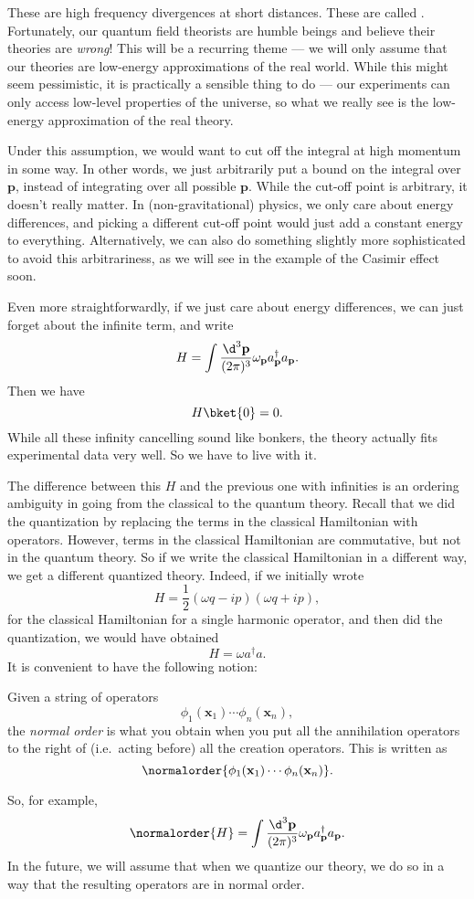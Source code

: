 \documentclass[a4paper]{article}
\begin{document}
These are high frequency divergences at short distances. These are called . Fortunately, our quantum field theorists are humble beings and believe their theories are \emph{wrong}! This will be a recurring theme --- we will only assume that our theories are low-energy approximations of the real world. While this might seem pessimistic, it is practically a sensible thing to do --- our experiments can only access low-level properties of the universe, so what we really see is the low-energy approximation of the real theory.

Under this assumption, we would want to cut off the integral at high momentum in some way. In other words, we just arbitrarily put a bound on the integral over $\mathbf{p}$, instead of integrating over all possible $\mathbf{p}$. While the cut-off point is arbitrary, it doesn't really matter. In (non-gravitational) physics, we only care about energy differences, and picking a different cut-off point would just add a constant energy to everything. Alternatively, we can also do something slightly more sophisticated to avoid this arbitrariness, as we will see in the example of the Casimir effect soon.

Even more straightforwardly, if we just care about energy differences, we can just forget about the infinite term, and write
\[
  H = \int \frac{\d^3 \mathbf{p}}{(2\pi)^3} \omega_\mathbf{p} a_\mathbf{p}^\dagger a_\mathbf{p}.
\]
Then we have
\[
  H \bket{0} = 0.
\]
While all these infinity cancelling sound like bonkers, the theory actually fits experimental data very well. So we have to live with it.

The difference between this $H$ and the previous one with infinities is an ordering ambiguity in going from the classical to the quantum theory. Recall that we did the quantization by replacing the terms in the classical Hamiltonian with operators. However, terms in the classical Hamiltonian are commutative, but not in the quantum theory. So if we write the classical Hamiltonian in a different way, we get a different quantized theory. Indeed, if we initially wrote
\[
  H = \frac{1}{2} (\omega q - ip)(\omega q + ip),
\]
for the classical Hamiltonian for a single harmonic operator, and then did the quantization, we would have obtained
\[
  H = \omega a^\dagger a.
\]
It is convenient to have the following notion:
\begin{defi}
  Given a string of operators
  \[
    \phi_1(\mathbf{x}_1) \cdots \phi_n(\mathbf{x}_n),
  \]
  the \emph{normal order} is what you obtain when you put all the annihilation operators to the right of (i.e.\ acting before) all the creation operators. This is written as
  \[
    \normalorder{\phi_1(\mathbf{x}_1) \cdots \phi_n(\mathbf{x}_n)}.
  \]
\end{defi}
So, for example,
\[
  \normalorder{H} = \int \frac{\d^3 \mathbf{p}}{(2\pi)^3} \omega_\mathbf{p} a_\mathbf{p}^\dagger a_\mathbf{p}.
\]
In the future, we will assume that when we quantize our theory, we do so in a way that the resulting operators are in normal order.
\end{document}
